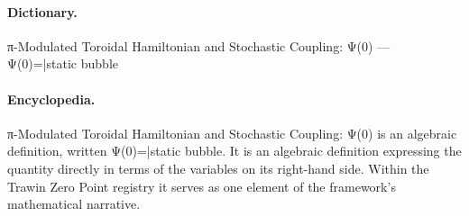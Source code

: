 \paragraph{Dictionary.}
π-Modulated Toroidal Hamiltonian and Stochastic Coupling: Ψ(0) — Ψ(0)=|static bubble

\paragraph{Encyclopedia.}
π-Modulated Toroidal Hamiltonian and Stochastic Coupling: Ψ(0) is an algebraic definition, written Ψ(0)=|static bubble. It is an algebraic definition expressing the quantity directly in terms of the variables on its right-hand side. Within the Trawin Zero Point registry it serves as one element of the framework's mathematical narrative.
